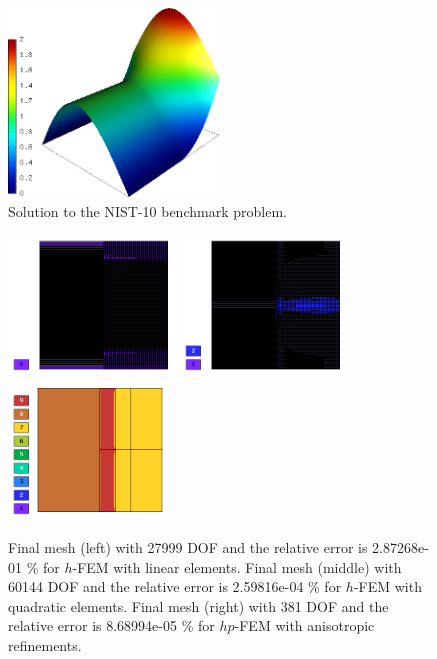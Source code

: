 \documentclass[12pt]{elsarticle}
\begin{document}
\begin{figure}[H]
\centering
\vspace{-6mm}
\includegraphics[height=5cm]{nist/nist-10/solution.png}
\vspace{-3mm}
\caption{Solution to the NIST-10 benchmark problem.}
\vspace{-3mm}
\label{fig:sln-nist10}
\end{figure}

\begin{figure}[H]
\centering
\vspace{-3mm}
\includegraphics[height=3.7cm]{nist/nist-10/mesh_h1_aniso.png}
\includegraphics[height=3.7cm]{nist/nist-10/mesh_h2_aniso.png}
\includegraphics[height=3.7cm]{nist/nist-10/mesh_hp_aniso.png}
\vspace{-3mm}
\caption{
Final mesh (left) with 27999 DOF and the relative error is 2.87268e-01 \% for $h$-FEM with linear elements.
Final mesh (middle) with 60144 DOF and the relative error is 2.59816e-04 \% for $h$-FEM with quadratic elements.
Final mesh (right) with 381 DOF and the relative error is 8.68994e-05 \% for $hp$-FEM with anisotropic refinements.}
\vspace{-3mm}
\label{fig:nist-10-hp-aniso}
\end{figure}
\end{document}
